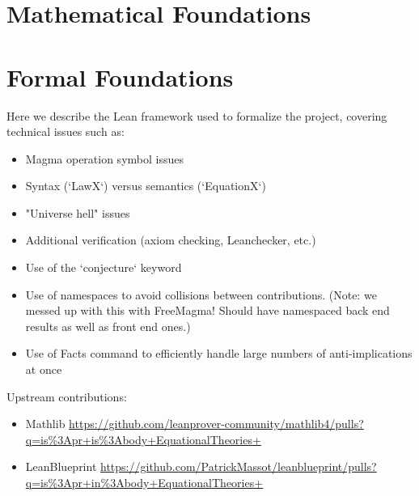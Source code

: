 \section{Mathematical Foundations}



\section{Formal Foundations}


    Here we describe the Lean framework used to formalize the project, covering technical issues such as:

\begin{itemize}
    \item Magma operation symbol issues
    \item Syntax (`LawX`) versus semantics (`EquationX`)
    \item "Universe hell" issues
    \item Additional verification (axiom checking, Leanchecker, etc.)
    \item Use of the `conjecture` keyword
    \item Use of namespaces to avoid collisions between contributions. (Note: we messed up with this with FreeMagma! Should have namespaced back end results as well as front end ones.)
    \item Use of Facts command to efficiently handle large numbers of anti-implications at once
\end{itemize}

Upstream contributions:
\begin{itemize}
    \item Mathlib \url{https://github.com/leanprover-community/mathlib4/pulls?q=is%3Apr+is%3Abody+EquationalTheories+}
    \item LeanBlueprint \url{https://github.com/PatrickMassot/leanblueprint/pulls?q=is%3Apr+in%3Abody+EquationalTheories+}
\end{itemize}
